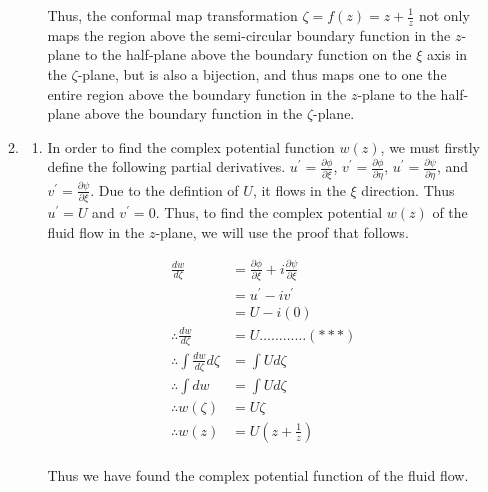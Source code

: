 \documentclass[a4paper]{article}
\begin{document}
\begin{enumerate}[label=\textbf{\arabic*.}]
\begin{enumerate}
\begin{enumerate}
			Thus, the conformal map transformation $\displaystyle{\zeta = f(z) = z + \frac{1}{z}}$ not only maps the region above the semi-circular boundary function in the $\displaystyle{z}$-plane to the half-plane above the boundary function on the $\displaystyle{\xi}$ axis in the $\displaystyle{\zeta}$-plane, but is also a bijection, and thus maps one to one the entire region above the boundary function in the $\displaystyle{z}$-plane to the half-plane above the boundary function in the $\displaystyle{\zeta}$-plane.

			\pagebreak

		\end{enumerate}

		\item
		\begin{enumerate}

			\item In order to find the complex potential function $\displaystyle{w(z)}$, we must firstly define the following partial derivatives. $\displaystyle{u^{\prime} = \frac{\partial \phi}{\partial \xi}}$, $\displaystyle{v^{\prime} = \frac{\partial \phi}{\partial \eta}}$, $\displaystyle{u^{\prime} = \frac{\partial \psi}{\partial \eta}}$, and $\displaystyle{v^{\prime} = \frac{\partial \psi}{\partial \xi}}$. Due to the defintion of $\displaystyle{U}$, it flows in the $\displaystyle{\xi}$ direction. Thus $\displaystyle{u^{\prime}} = U$ and $\displaystyle{v^{\prime}=0}$. Thus, to find the complex potential $\displaystyle{w(z)}$ of the fluid flow in the $\displaystyle{z}$-plane, we will use the proof that follows.

			\begin{align*}
			\frac{dw}{d\zeta} & = \frac{\partial \phi}{\partial \xi} + i\frac{\partial \psi}{\partial \xi}\\
			& = u^{\prime} - i v^{\prime}\\
			& = U - i(0)\\
			\therefore \frac{dw}{d\zeta} & = U \dots\dots\dots\dots(***)\\
			\therefore \int\frac{dw}{d\zeta}d\zeta & = \int U d\zeta\\
			\therefore \int{dw} & = \int U d\zeta\\
			\therefore w(\zeta) & = U\zeta\\
			\therefore w(z) & = U\left(z + \frac{1}{z}\right)\\
			\end{align*}

			Thus we have found the complex potential function of the fluid flow.


\end{enumerate}
\end{enumerate}
\end{enumerate}
\end{document}
